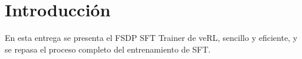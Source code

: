 \section{Introducción}
En esta entrega se presenta el FSDP SFT Trainer de veRL, sencillo y eficiente, y se repasa el proceso completo del entrenamiento de SFT.

